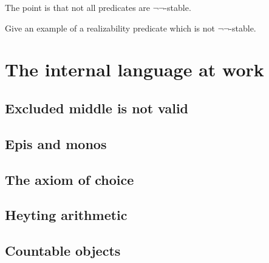 The point is that not all predicates are $\lnot\lnot$-stable.

\begin{exercise}
  Give an example of a realizability predicate which is not $\lnot\lnot$-stable.
\end{exercise}


\section{The internal language at work}
\label{sec:internal-language-at}

\subsection{Excluded middle is not valid}
\label{sec:excluded-middle}


\subsection{Epis and monos}
\label{sec:epis-monos}

\subsection{The axiom of choice}
\label{sec:axiom-choice}

\subsection{Heyting arithmetic}
\label{sec:heyting-arithmetic}

\subsection{Countable objects}
\label{sec:countable-objects}





